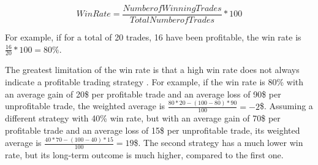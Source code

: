 \[
    WinRate = \frac{Number of Winning Trades}{Total Number of Trades} * 100
\]

For example, if for a total of 20 trades, 16 have been profitable, the win rate is $\frac{16}{20} * 100 = 80\%$.

The greatest limitation of the win rate is that a high win rate does not always indicate a profitable trading strategy \cite{win-rate}.
For example, if the win rate is 80\% with an average gain of 20\$ per profitable trade and an average loss of 90\$ per unprofitable trade, the weighted average is $\frac{80 * 20 - (100 - 80) * 90}{100} = -2$\$.
Assuming a different strategy with 40\% win rate, but with an average gain of 70\$ per profitable trade and an average loss of 15\$ per unprofitable trade, its weighted average is $\frac{40 * 70 - (100 - 40) * 15}{100} = 19$\$.
The second strategy has a much lower win rate, but its long-term outcome is much higher, compared to the first one.

